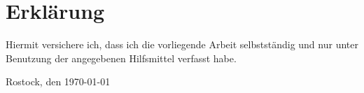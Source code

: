 \clearpage\thispagestyle{empty}

\chapter*{Erklärung}
Hiermit versichere ich, dass ich die vorliegende Arbeit selbstständig und 
nur unter Benutzung der angegebenen Hilfsmittel verfasst habe.

\vspace{4\baselineskip}

Rostock, den \today

